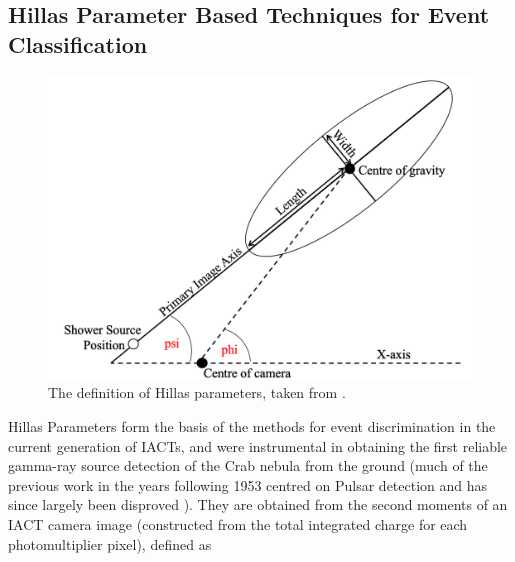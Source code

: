 \subsection{Hillas Parameter Based Techniques for Event Classification}
\begin{figure}[ht] 
        \centering \includegraphics[width=\columnwidth]{figures/hillas.png}
        \caption{
                \label{fig:hillas} %
                The definition of Hillas parameters, taken from \cite{ctapipe}.
        }
\end{figure}
Hillas Parameters form the basis of the methods for event discrimination in the current generation of IACTs, and were instrumental in obtaining the first reliable gamma-ray source detection of the Crab nebula from the ground \cite{whipple} (much of the previous work in the years following 1953 centred on Pulsar detection and has since largely been disproved \cite{paulathesis}). They are obtained \cite{tomthesis} \cite{weekestev} from the second moments of an IACT camera image (constructed from the total integrated charge for each photomultiplier pixel), defined as 
